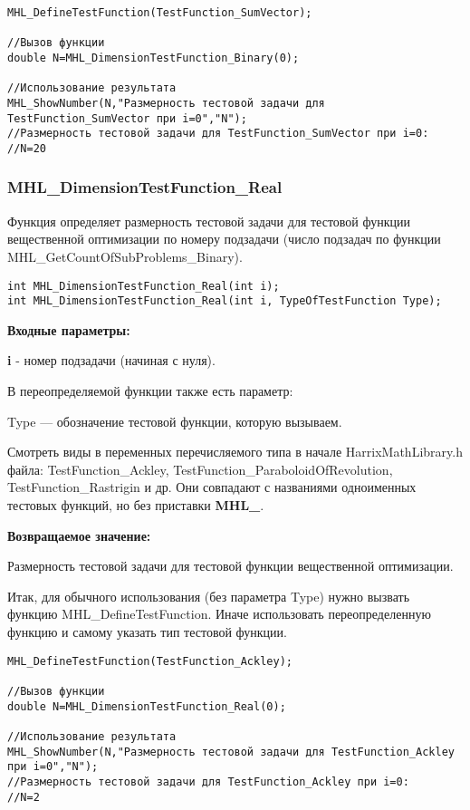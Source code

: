 \documentclass[a4paper,12pt]{article}
\begin{document}
\begin{lstlisting}[label=code_use_MHL_DimensionTestFunction_Binary,caption=Пример использования]
MHL_DefineTestFunction(TestFunction_SumVector);

//Вызов функции
double N=MHL_DimensionTestFunction_Binary(0);

//Использование результата
MHL_ShowNumber(N,"Размерность тестовой задачи для TestFunction_SumVector при i=0","N");
//Размерность тестовой задачи для TestFunction_SumVector при i=0:
//N=20
\end{lstlisting}

\subsubsection{MHL\_DimensionTestFunction\_Real}\label{MHL_DimensionTestFunction_Real}

Функция определяет размерность тестовой задачи для тестовой функции вещественной оптимизации по номеру подзадачи (число подзадач по функции MHL\_GetCountOfSubProblems\_Binary).


\begin{lstlisting}[label=code_syntax_MHL_DimensionTestFunction_Real,caption=Синтаксис]
int MHL_DimensionTestFunction_Real(int i);
int MHL_DimensionTestFunction_Real(int i, TypeOfTestFunction Type);
\end{lstlisting}

\textbf{Входные параметры:}

\textbf{i} - номер подзадачи (начиная с нуля).

В переопределяемой функции также есть параметр:
  
Type --- обозначение тестовой функции, которую вызываем. 

Смотреть виды в переменных перечисляемого типа в начале HarrixMathLibrary.h файла: TestFunction\_Ackley, TestFunction\_ParaboloidOfRevolution, TestFunction\_Rastrigin и др. Они совпадают с названиями одноименных тестовых функций, но без приставки \textbf{MHL\_}.

\textbf{Возвращаемое значение:}
 
Размерность тестовой задачи для тестовой функции вещественной оптимизации.

Итак, для обычного использования (без параметра Type) нужно вызвать функцию MHL\_DefineTestFunction. Иначе использовать переопределенную функцию и самому указать тип тестовой функции.


\begin{lstlisting}[label=code_use_MHL_DimensionTestFunction_Real,caption=Пример использования]
MHL_DefineTestFunction(TestFunction_Ackley);

//Вызов функции
double N=MHL_DimensionTestFunction_Real(0);

//Использование результата
MHL_ShowNumber(N,"Размерность тестовой задачи для TestFunction_Ackley при i=0","N");
//Размерность тестовой задачи для TestFunction_Ackley при i=0:
//N=2
\end{lstlisting}
\end{document}

